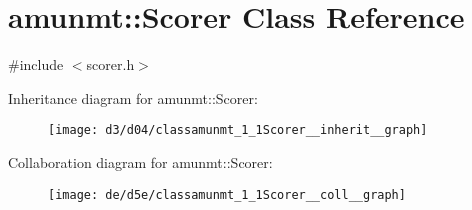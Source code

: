 \hypertarget{classamunmt_1_1Scorer}{}\section{amunmt\+:\+:Scorer Class Reference}
\label{classamunmt_1_1Scorer}


{\ttfamily \#include $<$scorer.\+h$>$}



Inheritance diagram for amunmt\+:\+:Scorer\+:
\nopagebreak
\begin{figure}[H]
\begin{center}
\leavevmode
\texttt{[image: d3/d04/classamunmt\_1\_1Scorer\_\_inherit\_\_graph]}
\end{center}
\end{figure}


Collaboration diagram for amunmt\+:\+:Scorer\+:
\nopagebreak
\begin{figure}[H]
\begin{center}
\leavevmode
\texttt{[image: de/d5e/classamunmt\_1\_1Scorer\_\_coll\_\_graph]}
\end{center}
\end{figure}
